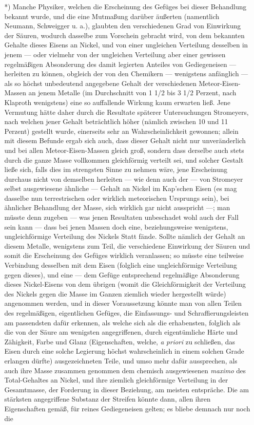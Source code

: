 \documentclass[a4paper, 11pt, oneside, german]{article}
\begin{document}
*) Manche Physiker, welchen die Erscheinung des Gefüges bei dieser Behandlung bekannt wurde, und die eine Mutmaßung darüber äußerten (namentlich Neumann, Schweigger u. a.), glaubten den verschiedenen Grad von Einwirkung der Säuren, wodurch dasselbe zum Vorschein gebracht wird, von dem bekannten Gehalte dieses Eisens an Nickel, und von einer ungleichen Verteilung desselben in jenem --- oder vielmehr von der ungleichen Verteilung aber einer gewissen regelmäßigen Absonderung des damit legierten Anteiles von Gediegeneisen --- herleiten zu können, obgleich der von den Chemikern --- wenigstens anfänglich --- als so höchst unbedeutend angegebene Gehalt der verschiedenen Meteor-Eisen-Massen an jenem Metalle (im Durchschnitt von 1 1/2 bis 3 1/2 Perzent, nach Klaproth wenigstens) eine so auffallende Wirkung kaum erwarten ließ. Jene Vermutung hätte daher durch die Resultate späterer Untersuchungen Stromeyers, nach welchen jener Gehalt beträchtlich höher (nämlich zwischen 10 und 11 Perzent) gestellt wurde, einerseits sehr an Wahrscheinlichkeit gewonnen; allein mit diesem Befunde ergab sich auch, dass dieser Gehalt nicht nur unveränderlich und bei allen Meteor-Eisen-Massen gleich groß, sondern dass derselbe auch stets durch die ganze Masse vollkommen gleichförmig verteilt sei, und solcher Gestalt ließe sich, falls dies im strengsten Sinne zu nehmen wäre, jene Erscheinung durchaus nicht von demselben herleiten --- wie denn auch der --- von Stromeyer selbst ausgewiesene ähnliche --- Gehalt an Nickel im Kap’schen Eisen (es mag dasselbe nun terrestrischen oder wirklich meteorischen Ursprungs sein), bei ähnlicher Behandlung der Masse, sich wirklich gar nicht ausspricht ---; man müsste denn zugeben --- was jenen Resultaten unbeschadet wohl auch der Fall sein kann --- dass bei jenen Massen doch eine, beziehungsweise wenigstens, ungleichförmige Verteilung des Nickels Statt fände. Sollte nämlich der Gehalt an diesem Metalle, wenigstens zum Teil, die verschiedene Einwirkung der Säuren und somit die Erscheinung des Gefüges wirklich veranlassen; so müsste eine teilweise Verbindung desselben mit dem Eisen (folglich eine ungleichförmige Verteilung gegen dieses), und eine --- dem Gefüge entsprechend regelmäßige Absonderung dieses Nickel-Eisens von dem übrigen (womit die Gleichförmigkeit der Verteilung des Nickels gegen die Masse im Ganzen ziemlich wieder hergestellt würde) angenommen werden, und in dieser Voraussetzung könnte man von allen Teilen des regelmäßigen, eigentlichen Gefüges, die Einfassungs- und Schraffierungsleisten am passendsten dafür erkennen, als welche sich als die erhabensten, folglich als die von der Säure am wenigsten angegriffenen, durch eigentümliche Härte und Zähigkeit, Farbe und Glanz (Eigenschaften, welche, \emph{a priori} zu schließen, das Eisen durch eine solche Legierung höchst wahrscheinlich in einem solchen Grade erlangen dürfte) ausgezeichneten Teile, und umso mehr dafür aussprechen, als auch ihre Masse zusammen genommen dem chemisch ausgewiesenen \emph{maximo} des Total-Gehaltes an Nickel, und ihre ziemlich gleichförmige Verteilung in der Gesamtmasse, der Forderung in dieser Beziehung, am meisten entspräche. Die am stärksten angegriffene Substanz der Streifen könnte dann, allen ihren Eigenschaften gemäß, für reines Gediegeneisen gelten; es bliebe demnach nur noch die 
\end{document}
